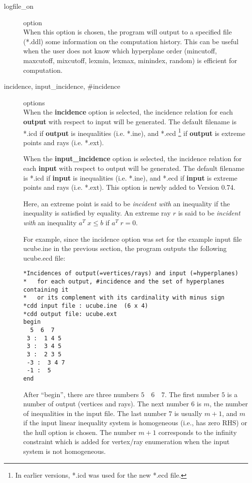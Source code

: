 \documentclass[11pt]{article}
\begin{document}
\begin{description}
\item[logfile\_on] option\\
 When this option is chosen, the program will output
to a specified file (*.ddl) some information on the computation history.
This can be useful when the user does not know which hyperplane order
(mincutoff, maxcutoff, mixcutoff, lexmin, lexmax, minindex, random)
is efficient for computation.

\item[incidence, input\_incidence,  \#incidence] options\\
When the {\bf incidence} option is selected, the incidence relation for
each {\bf output} with respect to input will be generated.    The default filename
is *.icd  if {\bf output} is inequalities (i.e. *.ine), and *.ecd  
\footnote {In earlier versions, *.icd was used for the new *.ecd file.}
if {\bf output} is extreme points and
rays (i.e. *.ext).

When the {\bf input\_incidence} option is selected, the incidence relation for
each {\bf input} with respect to output will be generated.    The default filename
is *.icd  if {\bf input} is inequalities (i.e. *.ine), and *.ecd  
if {\bf input} is extreme points and
rays (i.e. *.ext).  This option is newly added to Version 0.74.

Here, an extreme point is said to be 
{\em incident with\/} an inequality if the inequality is satisfied by equality.
An extreme ray $r$ is said to be {\em incident with\/} 
an inequality $a^T \; x \le b$ if  $a^T \; r = 0$.  

For example,
since the incidence option was set for the example input file ucube.ine in
the previous section, the program outputs the following ucube.ecd file:
\begin{verbatim}
*Incidences of output(=vertices/rays) and input (=hyperplanes)
*   for each output, #incidence and the set of hyperplanes containing it
*   or its complement with its cardinality with minus sign
*cdd input file : ucube.ine  (6 x 4)
*cdd output file: ucube.ext
begin
  5  6  7
 3 :  1 4 5
 3 :  3 4 5
 3 :  2 3 5
 -3 :  3 4 7
 -1 :  5
end
\end{verbatim}
After ``begin'', there are three numbers $5 \quad 6 \quad 7$.
The first number $5$ is a number of output (vertices and rays).
The next number $6$ is $m$, the number of inequalities in the input file.
The last number $7$ is usually $m+1$, and $m$ if the input linear inequality
system is homogeneous (i.e., has zero RHS) or the hull option is chosen.
The number $m+1$ corresponds to the infinity constraint which is added
for vertex/ray enumeration when the input system is not homogeneous.


\end{description}
\end{document}
